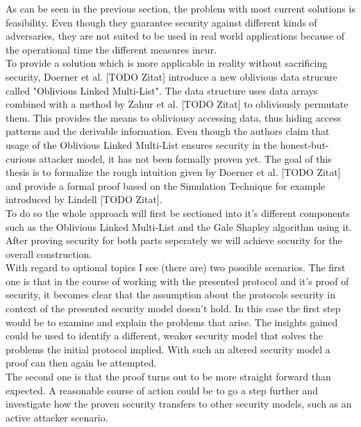 As can be seen in the previous section, the problem with most current solutions is feasibility. Even though they guarantee security against different kinds of adversaries, they are not suited to be used in real world applications because of the operational time the different measures incur.\\
To provide a solution which is more applicable in reality without sacrificing security, Doerner et al. [TODO Zitat] introduce a new oblivious data strucure called "Oblivious Linked Multi-List". The data structure uses data arrays combined with a method by Zahur et al. [TODO Zitat] to obliviously permutate them. This provides the means to obliviousy accessing data, thus hiding access patterns and the derivable information. Even though the authors claim that usage of the Oblivious Linked Multi-List ensures security in the honest-but-curious attacker model, it has not been formally proven yet. The goal of this thesis is to formalize the rough intuition given by Doerner et al. [TODO Zitat] and provide a formal proof based on the Simulation Technique for example introduced by Lindell [TODO Zitat].\\
To do so the whole approach will first be sectioned into it's different components such as the Oblivious Linked Multi-List and the Gale Shapley algorithm using it. After proving security for both parts seperately we will achieve security for the overall construction.
\ \\With regard to optional topics I see (there are) two possible scenarios. 
The first one is that in the course of working with the presented protocol and it's proof of security, it becomes clear that the assumption about the protocols security in context of the presented security model doesn't hold. In this case the first step would be to examine and explain the problems that arise. The insights gained could be used to identify a different, weaker security model that solves the problems the initial protocol implied. With such an altered security model a proof can then again be attempted.\\
The second one is that the proof turns out to be more straight forward than expected. A reasonable course of action could be to go a step further and investigate how the proven security transfers to other security models, such as an active attacker scenario.